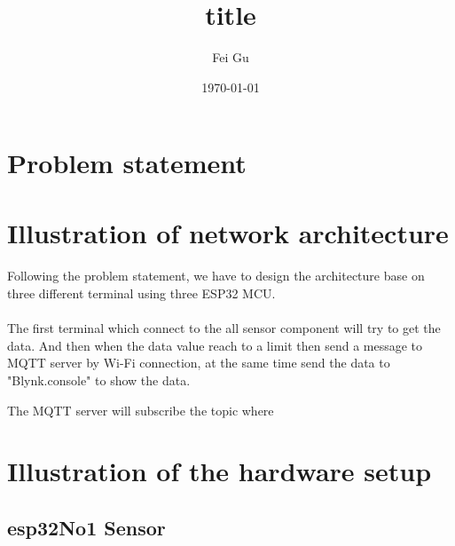 \documentclass[12pt, a4, utf8]{report}        %
\title{title}                       %
\author{Fei Gu}
\date{\today}
\begin{document}
    \maketitle
    \tableofcontents


    \section{Problem statement}\label{sec:problem-statement}


    \section{Illustration of network architecture}\label{sec:illustration-of-network-architecture}


    \paragraph{}
    Following the problem statement, we have to design the architecture base on three different terminal using three ESP32 MCU.


    \paragraph{}
    The first terminal which connect to the all sensor component will try to get the data.
    And then when the data value reach to a limit then send a message to MQTT server by Wi-Fi connection, at the
    same time send the data to "Blynk.console" to show the data.


    \paragrapg{}
    The MQTT server will subscribe the topic where


    \section{Illustration of the hardware setup}\label{sec:illustration-of-the-hardware-setup}

    \subsection{esp32No1 Sensor}\label{subsec:esp32no1-sensor}
\end{document}
